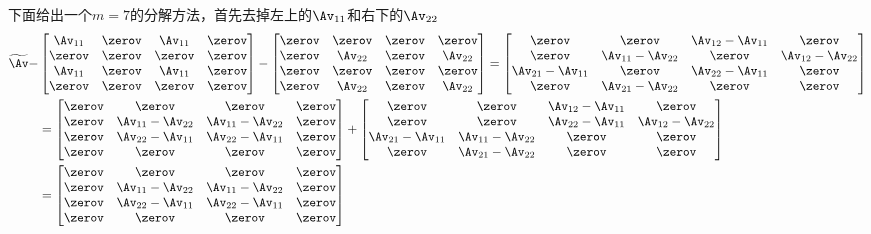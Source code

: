 \documentclass{ctexart}
\begin{document}
下面给出一个$m = 7$的分解方法，首先去掉左上的$\Av_{11}$和右下的$\Av_{22}$
\begin{align*}
    \widetilde{\Av} -
                      &
    \begin{bmatrix}
        \Av_{11} & \zerov & \Av_{11} & \zerov \\
        \zerov   & \zerov & \zerov   & \zerov \\
        \Av_{11} & \zerov & \Av_{11} & \zerov \\
        \zerov   & \zerov & \zerov   & \zerov
    \end{bmatrix} -
    \begin{bmatrix}
        \zerov & \zerov & \zerov & \zerov \\ \zerov & \Av_{22} & \zerov & \Av_{22} \\ \zerov & \zerov & \zerov & \zerov \\ \zerov & \Av_{22} & \zerov & \Av_{22}
    \end{bmatrix} =
    \begin{bmatrix}
        \zerov & \zerov & \Av_{12} - \Av_{11} & \zerov \\ \zerov & \Av_{11} - \Av_{22} & \zerov & \Av_{12} - \Av_{22} \\ \Av_{21} - \Av_{11} & \zerov & \Av_{22} - \Av_{11} & \zerov \\ \zerov & \Av_{21} - \Av_{22} & \zerov & \zerov
    \end{bmatrix} \\
                      & =
    \begin{bmatrix}
        \zerov & \zerov & \zerov & \zerov \\ \zerov & \Av_{11} - \Av_{22} & \Av_{11} - \Av_{22} & \zerov \\ \zerov & \Av_{22} - \Av_{11} & \Av_{22} - \Av_{11} & \zerov \\ \zerov & \zerov & \zerov & \zerov
    \end{bmatrix} +
    \begin{bmatrix}
        \zerov & \zerov & \Av_{12} - \Av_{11} & \zerov \\ \zerov & \zerov & \Av_{22} - \Av_{11} & \Av_{12} - \Av_{22} \\ \Av_{21} - \Av_{11} & \Av_{11} - \Av_{22} & \zerov & \zerov \\ \zerov & \Av_{21} - \Av_{22} & \zerov & \zerov
    \end{bmatrix} \\
                      & = \begin{bmatrix}
                              \zerov & \zerov & \zerov & \zerov \\ \zerov & \Av_{11} - \Av_{22} & \Av_{11} - \Av_{22} & \zerov \\ \zerov & \Av_{22} - \Av_{11} & \Av_{22} - \Av_{11} & \zerov \\ \zerov & \zerov & \zerov & \zerov

\end{bmatrix}
\end{align*}
\end{document}
